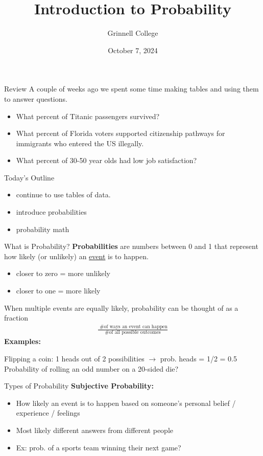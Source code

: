 \documentclass{beamer}
\title[SST-115 / STA-209]{Introduction to Probability}
\subtitle{}
\author{Grinnell College}
\date{October 7, 2024}
\begin{document}
\begin{frame}
  \titlepage
\end{frame}

\begin{frame}{Review}
A couple of weeks ago we spent some time making tables and using them to answer questions.
\begin{itemize}
    \item What percent of Titanic passengers survived?
    \item What percent of Florida voters supported citizenship pathways for immigrants who entered the US illegally. 
    \item What percent of 30-50 year olds had low job satisfaction?
\end{itemize}
\end{frame}

\begin{frame}{Today's Outline}
\begin{itemize}
    \item continue to use tables of data.
    \item introduce probabilities
    \item probability math
\end{itemize}
\end{frame}

\begin{frame}{What is Probability?}
\textbf{Probabilities} are numbers between 0 and 1 that represent how likely (or unlikely) an \underline{event} is to happen. \vspace{3mm}
\begin{itemize}
    \item closer to zero = more unlikely
    \item closer to one = more likely
\end{itemize} \vspace{5mm}
When multiple events are equally likely, probability can be thought of as a fraction
\begin{align*}
\frac{\text{ \# of ways an event can happen}}{\text{\# of all possible outcomes}}
\end{align*}
\textbf{Examples:}

Flipping a coin: 1 heads out of 2 possibilities $\rightarrow$ prob. heads = 1/2 = 0.5
Probability of rolling an odd number on a 20-sided die?
\end{frame}

\begin{frame}{Types of Probability}
\textbf{Subjective Probability:}
\begin{itemize}
    \item How likely an event is to happen based on someone's personal belief / experience / feelings
    \item Most likely different answers from different people
    \item Ex: prob. of a sports team winning their next game?
\end{itemize}
\end{frame}
\end{document}
